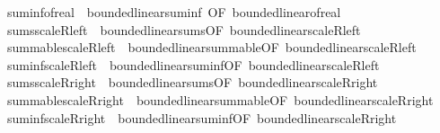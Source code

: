 \begin{isabellebody}
\isamarkupfalse%
\ suminf{\isacharunderscore}{\kern0pt}of{\isacharunderscore}{\kern0pt}real\ {\isacharequal}{\kern0pt}\ bounded{\isacharunderscore}{\kern0pt}linear{\isachardot}{\kern0pt}suminf\ {\isacharbrackleft}{\kern0pt}OF\ bounded{\isacharunderscore}{\kern0pt}linear{\isacharunderscore}{\kern0pt}of{\isacharunderscore}{\kern0pt}real{\isacharbrackright}{\kern0pt}\isanewline
\isanewline
{}\isamarkupfalse%
\ sums{\isacharunderscore}{\kern0pt}scaleR{\isacharunderscore}{\kern0pt}left\ {\isacharequal}{\kern0pt}\ bounded{\isacharunderscore}{\kern0pt}linear{\isachardot}{\kern0pt}sums{\isacharbrackleft}{\kern0pt}OF\ bounded{\isacharunderscore}{\kern0pt}linear{\isacharunderscore}{\kern0pt}scaleR{\isacharunderscore}{\kern0pt}left{\isacharbrackright}{\kern0pt}\isanewline
{}\isamarkupfalse%
\ summable{\isacharunderscore}{\kern0pt}scaleR{\isacharunderscore}{\kern0pt}left\ {\isacharequal}{\kern0pt}\ bounded{\isacharunderscore}{\kern0pt}linear{\isachardot}{\kern0pt}summable{\isacharbrackleft}{\kern0pt}OF\ bounded{\isacharunderscore}{\kern0pt}linear{\isacharunderscore}{\kern0pt}scaleR{\isacharunderscore}{\kern0pt}left{\isacharbrackright}{\kern0pt}\isanewline
{}\isamarkupfalse%
\ suminf{\isacharunderscore}{\kern0pt}scaleR{\isacharunderscore}{\kern0pt}left\ {\isacharequal}{\kern0pt}\ bounded{\isacharunderscore}{\kern0pt}linear{\isachardot}{\kern0pt}suminf{\isacharbrackleft}{\kern0pt}OF\ bounded{\isacharunderscore}{\kern0pt}linear{\isacharunderscore}{\kern0pt}scaleR{\isacharunderscore}{\kern0pt}left{\isacharbrackright}{\kern0pt}\isanewline
\isanewline
{}\isamarkupfalse%
\ sums{\isacharunderscore}{\kern0pt}scaleR{\isacharunderscore}{\kern0pt}right\ {\isacharequal}{\kern0pt}\ bounded{\isacharunderscore}{\kern0pt}linear{\isachardot}{\kern0pt}sums{\isacharbrackleft}{\kern0pt}OF\ bounded{\isacharunderscore}{\kern0pt}linear{\isacharunderscore}{\kern0pt}scaleR{\isacharunderscore}{\kern0pt}right{\isacharbrackright}{\kern0pt}\isanewline
{}\isamarkupfalse%
\ summable{\isacharunderscore}{\kern0pt}scaleR{\isacharunderscore}{\kern0pt}right\ {\isacharequal}{\kern0pt}\ bounded{\isacharunderscore}{\kern0pt}linear{\isachardot}{\kern0pt}summable{\isacharbrackleft}{\kern0pt}OF\ bounded{\isacharunderscore}{\kern0pt}linear{\isacharunderscore}{\kern0pt}scaleR{\isacharunderscore}{\kern0pt}right{\isacharbrackright}{\kern0pt}\isanewline
{}\isamarkupfalse%
\ suminf{\isacharunderscore}{\kern0pt}scaleR{\isacharunderscore}{\kern0pt}right\ {\isacharequal}{\kern0pt}\ bounded{\isacharunderscore}{\kern0pt}linear{\isachardot}{\kern0pt}suminf{\isacharbrackleft}{\kern0pt}OF\ bounded{\isacharunderscore}{\kern0pt}linear{\isacharunderscore}{\kern0pt}scaleR{\isacharunderscore}{\kern0pt}right{\isacharbrackright}{\kern0pt}\isanewline

\end{isabellebody}
